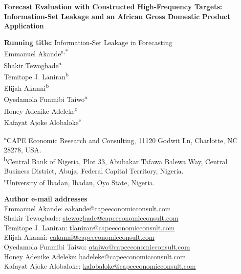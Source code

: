 \documentclass[11pt]{article}
\begin{document}
\begin{center}
{\Large\bfseries Forecast Evaluation with Constructed High-Frequency Targets: Information-Set Leakage and an African Gross Domestic Product Application\par}
\vspace{0.3cm}
\textbf{Running title:} Information-Set Leakage in Forecasting\\
\vspace{0.25cm}
Emmanuel Akande\textsuperscript{a,*}\\
Shakir Tewogbade\textsuperscript{a}\\
Temitope J. Laniran\textsuperscript{b}\\
Elijah Akanni\textsuperscript{b}\\
Oyedamola Funmibi Taiwo\textsuperscript{a}\\
Honey Adenike Adeleke\textsuperscript{c}\\
Kafayat Ajoke Alobaloke\textsuperscript{c}
\end{center}
\vspace{0.4cm}
\textsuperscript{a}CAPE Economic Research and Consulting, 11120 Godwit Ln, Charlotte, NC 28278, USA.\\
\textsuperscript{b}Central Bank of Nigeria, Plot 33, Abubakar Tafawa Balewa Way, Central Business District, Abuja, Federal Capital Territory, Nigeria.\\
\textsuperscript{c}University of Ibadan, Ibadan, Oyo State, Nigeria.

\textbf{Author e-mail addresses}\\
Emmanuel Akande: \href{mailto:eakande@capeeconomicconsult.com}{eakande@capeeconomicconsult.com}\\
Shakir Tewogbade: \href{mailto:stewogbade@capeeconomicconsult.com}{stewogbade@capeeconomicconsult.com}\\
Temitope J. Laniran: \href{mailto:tlaniran@capeeconomicconsult.com}{tlaniran@capeeconomicconsult.com}\\
Elijah Akanni: \href{mailto:eakanni@capeeconomicconsult.com}{eakanni@capeeconomicconsult.com}\\
Oyedamola Funmibi Taiwo: \href{mailto:otaiwo@capeeconomicconsult.com}{otaiwo@capeeconomicconsult.com}\\
Honey Adenike Adeleke: \href{mailto:hadeleke@capeeconomicconsult.com}{hadeleke@capeeconomicconsult.com}\\
Kafayat Ajoke Alobaloke: \href{mailto:kalobaloke@capeeconomicconsult.com}{kalobaloke@capeeconomicconsult.com}
\end{document}
